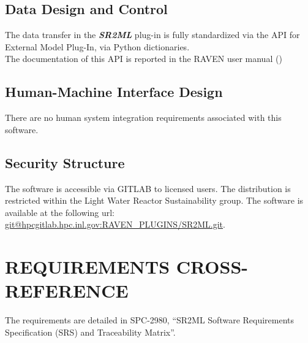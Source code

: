 \subsection{Data Design and Control}
The data transfer in the \textbf{\textit{SR2ML}}  plug-in is fully standardized via the API for External Model Plug-In, via
Python dictionaries.
\\The documentation of this  API is reported in the RAVEN user manual (\cite{RAVENuserManual})

\subsection{Human-Machine Interface Design}
 There are no human system integration requirements associated with this software.

 \subsection{Security Structure}


The software is accessible via GITLAB to licensed users. The distribution is restricted within the Light Water Reactor Sustainability group.
The software is available at the following url: \url{git@hpcgitlab.hpc.inl.gov:RAVEN_PLUGINS/SR2ML.git}.

 \section{REQUIREMENTS CROSS-REFERENCE}
The requirements are detailed in SPC-2980, ``SR2ML Software Requirements Specification (SRS) and Traceability Matrix''.
